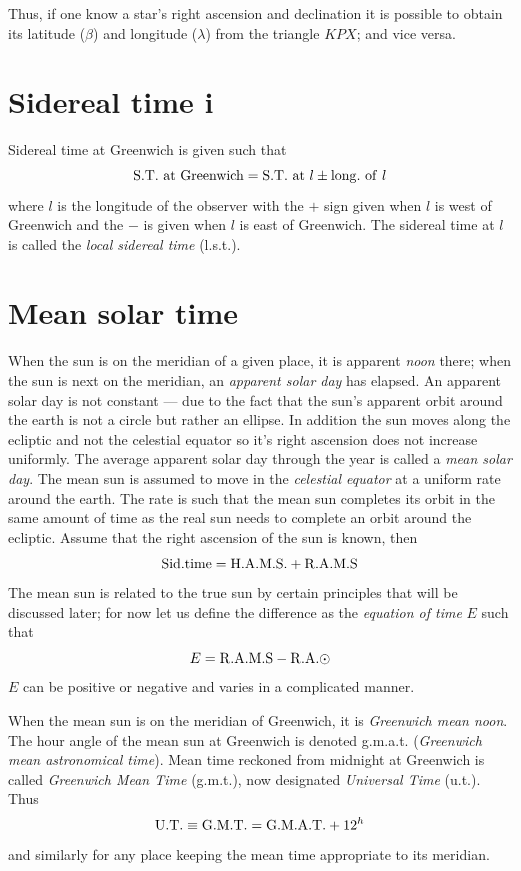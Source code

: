 Thus, if one know a star's right ascension and declination it is
possible to obtain its latitude ($\beta$) and longitude ($\lambda$)
from the triangle $KPX$; and vice versa.

\section{Sidereal time {\sc i}}
\label{sec:sidereal_time_i}

Sidereal time at Greenwich is given such that
\[
{\rm S.T.~at~Greenwich}={\rm S.T.~at}~l\pm{\rm long.~of~}l
\]
where $l$ is the longitude of the observer with the $+$ sign given
when $l$ is west of Greenwich and the $-$ is given when $l$ is east of
Greenwich. The sidereal time at $l$ is called the {\it local sidereal
  time} ({\sc l.s.t.}).

\section{Mean solar time}

When the sun is on the meridian of a given place, it is apparent {\it
  noon} there; when the sun is next on the meridian, an {\it apparent
  solar day} has elapsed. An apparent solar day is not constant --- due
to the fact that the sun's apparent orbit around the earth is not a
circle but rather an ellipse. In addition the sun moves along the
ecliptic and not the celestial equator so it's right ascension does
not increase uniformly. The average apparent solar day through the
year is called a {\it mean solar day}. The mean sun is assumed to
move in the {\it celestial equator} at a uniform rate around the
earth. The rate is such that the mean sun completes its orbit in the
same amount of time as the real sun needs to complete an orbit around
the ecliptic. Assume that the right ascension of the sun is known,
then 
\[
{\rm Sid. time}={\rm H.A.M.S.}+{\rm R.A.M.S}
\]
The mean sun is related to the true sun by certain principles that
will be discussed later; for now let us define the difference as the
{\it equation of time} $E$ such that
\[
E={\rm R.A.M.S-R.A.\astrosun}
\]
$E$ can be positive or negative and varies in a complicated manner. 

When the mean sun is on the meridian of Greenwich, it is {\it Greenwich
  mean noon}. The hour angle of the mean sun at Greenwich is denoted
{\sc g.m.a.t.} ({\it Greenwich mean astronomical time}). 
Mean time reckoned from midnight at Greenwich is called
{\it Greenwich Mean Time} ({\sc g.m.t.}), now designated {\it
  Universal Time} ({\sc u.t.}). Thus
\[
{\rm U.T.}\equiv{\rm G.M.T.}={\rm G.M.A.T.}+12^h
\]
and similarly for any place keeping the mean time appropriate to its
meridian. 


